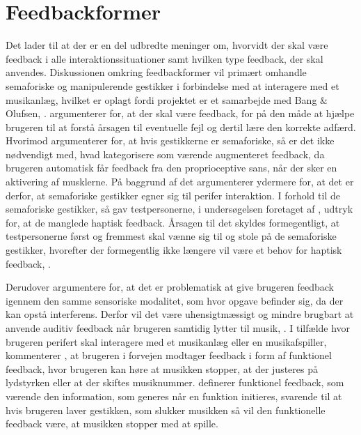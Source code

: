 \section{Feedbackformer}
\label{Feedbackformer}
%
Det lader til at der er en del udbredte meninger om, hvorvidt der skal være feedback i alle interaktionssituationer samt hvilken type feedback, der skal anvendes. Diskussionen omkring feedbackformer vil primært omhandle semaforiske og manipulerende gestikker i forbindelse med at interagere med et musikanlæg, hvilket er oplagt fordi projektet er et samarbejde med Bang $\&$ Olufsen, . \blankline
%
\textcite[s. 10]{PDF:NaturalUserInterfaces} argumenterer for, at der skal være feedback, for på den måde at hjælpe brugeren til at forstå årsagen til eventuelle fejl og dertil lære den korrekte adfærd. Hvorimod \textcite[s. 16]{PDF:PIEmbeddingHCIOnTheRelevance} argumenterer for, at hvis gestikkerne er semaforiske, så er det ikke nødvendigt med, hvad \textcite[s. 16]{PDF:PIEmbeddingHCIOnTheRelevance} kategorisere som værende augmenteret feedback, da brugeren automatisk får feedback fra den proprioceptive sans, når der sker en aktivering af musklerne. På baggrund af det argumenterer \textcite[s. 16]{PDF:PIEmbeddingHCIOnTheRelevance} ydermere for, at det er derfor, at semaforiske gestikker egner sig til perifer interaktion. I forhold til de semaforiske gestikker, så gav testpersonerne, i undersøgelsen foretaget af \textcite[ss. 172-173]{PDF:ComparingInputModalities}, udtryk for, at de manglede haptisk feedback. Årsagen til det skyldes formegentligt, at testpersonerne først og fremmest skal vænne sig til og stole på de semaforiske gestikker, hvorefter der formegentlig ikke længere vil være et behov for haptisk feedback, \parencite[s. 174]{PDF:ComparingInputModalities}. 

Derudover argumentere \textcite[s. 3]{PDF:FacilitatingPIDesignAndEvaluation} for, at det er problematisk at give brugeren feedback igennem den samme sensoriske modalitet, som hvor opgave befinder sig, da der kan opstå interferens. Derfor vil det være uhensigtmæssigt og mindre brugbart at anvende auditiv feedback når brugeren samtidig lytter til musik, \parencite[s. 3]{PDF:FacilitatingPIDesignAndEvaluation}. I tilfælde hvor brugeren perifert skal interagere med et musikanlæg eller en musikafspiller, kommenterer \textcite[s. 19]{PDF:PIEmbeddingHCIOnTheRelevance}, at brugeren i forvejen modtager feedback i form af funktionel feedback, hvor brugeren kan høre at musikken stopper, at der justeres på lydstyrken eller at der skiftes musiknummer. \textcite[s. 3]{PDF:InteractionFrogger} definerer funktionel feedback, som værende den information, som generes når en funktion initieres, svarende til at hvis brugeren laver gestikken, som slukker musikken så vil den funktionelle feedback være, at musikken stopper med at spille. 

